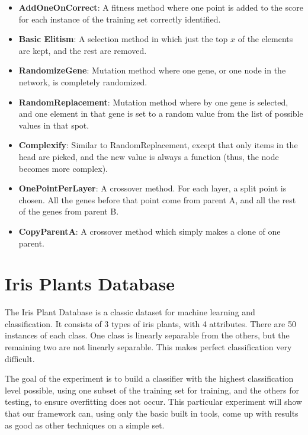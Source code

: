 \documentclass[a4paper,11pt]{report}
\begin{document}
\begin{itemize}
 \item \textbf{AddOneOnCorrect}: A fitness method where one point is added to the score for each instance of the training 
set correctly identified.
 \item \textbf{Basic Elitism}: A selection method in which just the top $x$ of the elements are kept, and the rest are removed.
 \item \textbf{RandomizeGene}: Mutation method where one gene, or one node in the network, is completely randomized.
 \item \textbf{RandomReplacement}: Mutation method where by one gene is selected, and one element in that gene is set to a 
random value from the list of possible values in that spot.
\item \textbf{Complexify}: Similar to RandomReplacement, except that only items in the head are picked, and the new 
value is always a function (thus, the node becomes more complex).
\item \textbf{OnePointPerLayer}: A crossover method. For each layer, a split point is chosen. 
All the genes before that point come from parent A, and all the rest of the genes from parent B. 
\item \textbf{CopyParentA}: A crossover method which simply makes a clone of one parent.
\end{itemize}

\section{Iris Plants Database}
The Iris Plant Database is a classic dataset for machine learning and classification. It consists
of 3 types of iris plants, with 4 attributes. There are 50 instances of each class. One class is 
linearly separable from the others, but the remaining two are not linearly separable. This makes 
perfect classification very difficult.  

The goal of the experiment is to build a classifier with the highest classification level possible, 
using one subset of the training set for training, and the others for testing, to ensure overfitting 
does not occur. This particular experiment will show that our framework can, using only the basic 
built in tools, come up with results as good as other techniques on a simple set.

\end{document}
